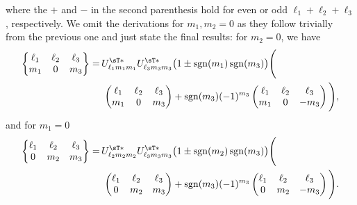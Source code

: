 where the $+$ and $-$ in the second parenthesis hold for even or odd $\ell_1 + \ell_2 + \ell_3$, respectively.
We omit the derivations for $m_1,m_2 = 0$ as they follow trivially from the previous one and just state the final results:
for $m_2 = 0$, we have
\begin{equation}\label{eq:w3j-rsph-expr2.2}
\begin{aligned}
    \begin{Bmatrix}
        \ell_1 & \ell_2 & \ell_3 \\ m_1 & 0 & m_3
    \end{Bmatrix}
    =\,&
    U^{\sT\ast}_{\ell_1 m_1m_1} U^{\sT\ast}_{\ell_3 m_3m_3}
    \big( 1 \pm \operatorname{sgn}(m_1)\operatorname{sgn}(m_3) \big)
    \Bigg( \\
    &\,
    \begin{pmatrix}
        \ell_1 & \ell_2 & \ell_3 \\ m_1 & 0 & m_3
    \end{pmatrix}
    +
    \operatorname{sgn}(m_3)(-1)^{m_3}
    \begin{pmatrix}
        \ell_1 & \ell_2 & \ell_3 \\ m_1 & 0 & -m_3
    \end{pmatrix}
    \Bigg)
    ,
\end{aligned}
\end{equation}
and for $m_1 = 0$
\begin{equation}\label{eq:w3j-rsph-expr2.3}
\begin{aligned}
    \begin{Bmatrix}
        \ell_1 & \ell_2 & \ell_3 \\ 0 & m_2 & m_3
    \end{Bmatrix}
    =\,&
    U^{\sT\ast}_{\ell_2 m_2m_2} U^{\sT\ast}_{\ell_3 m_3m_3}
    \big( 1 \pm \operatorname{sgn}(m_2)\operatorname{sgn}(m_3) \big)
    \Bigg( \\
    &\,
    \begin{pmatrix}
        \ell_1 & \ell_2 & \ell_3 \\ 0 & m_2 & m_3
    \end{pmatrix}
    +
    \operatorname{sgn}(m_3)(-1)^{m_3}
    \begin{pmatrix}
        \ell_1 & \ell_2 & \ell_3 \\ 0 & m_2 & -m_3
    \end{pmatrix}
    \Bigg)
    .
\end{aligned}
\end{equation}

